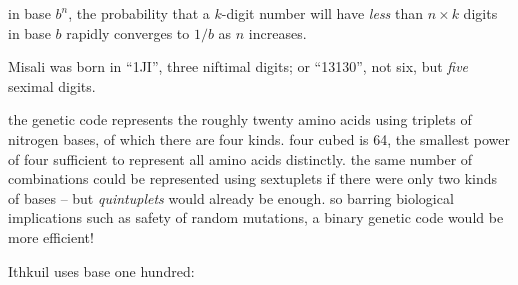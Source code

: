 \documentclass[../footnotes.tex]{subfiles}
\begin{document}
\myfootnote{} in base $b^n$, the probability that a $k$-digit number will have \emph{less} than $n \times k$ digits in base $b$ rapidly converges to $1/b$ as $n$ increases.

\myfootnote{} Misali was born in ``1JI'', three niftimal digits; or ``13130'', not six, but \emph{five} seximal digits.

\myfootnote{} the genetic code represents the roughly twenty amino acids using triplets of nitrogen bases, of which there are four kinds. four cubed is 64, the smallest power of four sufficient to represent all amino acids distinctly. the same number of combinations could be represented using sextuplets if there were only two kinds of bases -- but \emph{quintuplets} would already be enough. so barring biological implications such as safety of random mutations, a binary genetic code would be more efficient!

\myfootnote{} Ithkuil uses base one hundred: \\
\end{document}
